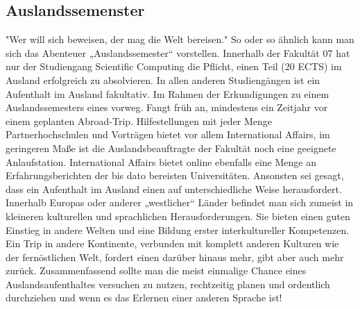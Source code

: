 \subsection{Auslandssemenster}
"Wer will sich beweisen, der mag die Welt bereisen."
So oder so ähnlich kann man sich das Abenteuer „Auslandssemester“ 
vorstellen. Innerhalb der Fakultät 07 hat nur der Studiengang Scientific 
Computing die Pflicht, einen Teil (20 ECTS) im Ausland erfolgreich zu 
absolvieren. In allen anderen Studiengängen ist ein Aufenthalt im 
Ausland fakultativ. 
Im Rahmen der Erkundigungen zu einem Auslandssemesters eines 
vorweg. Fangt früh an, mindestens ein Zeitjahr vor einem geplanten 
Abroad-Trip. Hilfestellungen mit jeder Menge Partnerhochschulen 
und Vorträgen bietet vor allem International Affairs, im geringeren 
Maße ist die Auslandsbeauftragte der Fakultät noch eine geeignete 
Anlaufstation. International Affairs bietet online ebenfalls eine Menge 
an Erfahrungsberichten der bis dato bereisten Universitäten. 
Ansonsten sei gesagt, dass ein Aufenthalt im Ausland einen auf 
unterschiedliche Weise herausfordert. Innerhalb Europas oder anderer 
„westlicher“ Länder befindet man sich zumeist in kleineren kulturellen 
und sprachlichen Herausforderungen. 
Sie bieten einen guten Einstieg in andere Welten und eine Bildung 
erster interkultureller Kompetenzen. Ein Trip in andere Kontinente, 
verbunden mit komplett anderen Kulturen wie der fernöstlichen Welt, 
fordert einen darüber hinaus mehr, gibt aber auch mehr zurück. 
Zusammenfassend sollte man die meist einmalige Chance eines 
Auslandsaufenthaltes versuchen zu nutzen, rechtzeitig planen und 
ordentlich durchziehen und wenn es das Erlernen einer anderen 
Sprache ist! 